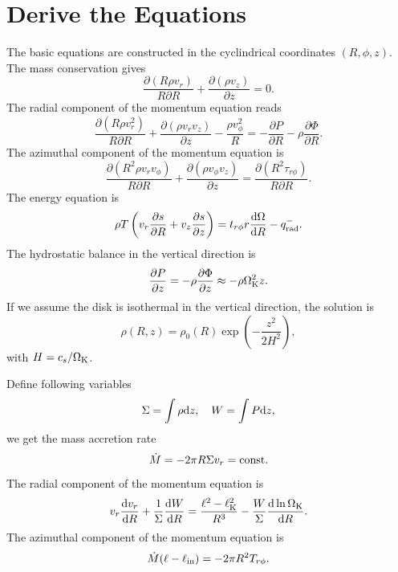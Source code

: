 \documentclass[oneside]{book}
\def\rd{{\rm d}}
\begin{document}
\chapter{Derive the Equations}
The basic equations are constructed in the cyclindrical coordinates $(R, \phi, z)$.
The mass conservation gives
\begin{equation}
\frac{\partial (R\rho v_r)}{R\partial R}+\frac{\partial (\rho v_z)}{\partial z}=0.
\end{equation}
The radial component of  the momentum equation reads
\begin{equation}
\frac{\partial (R\rho v_r^2)}{R\partial R}+\frac{\partial(\rho v_r v_z)}{\partial z}-\frac{\rho v_\phi^2}{R}
=-\frac{\partial P}{\partial R}-\rho\frac{\partial\Phi}{\partial R}.
\end{equation}
The azimuthal component of the momentum equation is
\begin{equation}
\frac{\partial(R^2\rho v_rv_\phi)}{R\partial R}+\frac{\partial (\rho v_\phi v_z)}{\partial z}
=\frac{\partial (R^2 \tau_{r\phi})}{R\partial R}.
\end{equation}
The energy equation is 
\begin{equation}
 \rho T\left(v_r\frac{\partial s}{\partial R}+v_z\frac{\partial s}{\partial z}\right)
 =t_{r\phi} r\frac{\rd\Omega}{\rd R}-q_{\rm rad}^-.
\end{equation}
The hydrostatic balance in the vertical direction is
\begin{equation}
\frac{\partial P}{\partial z}=-\rho\frac{\partial \Phi}{\partial z}\approx-\rho\Omega_{\rm K}^2z.
\end{equation}
If we assume the disk is isothermal in the vertical direction, the solution is 
\begin{equation}
\rho(R, z)=\rho_0(R)\exp\left(-\frac{z^2}{2H^2}\right),
\end{equation}
with $H=c_s/\Omega_{\rm K}$.

Define following variables
\begin{equation}
\Sigma=\int\rho\rd z, ~~~W=\int P\rd z,
\end{equation}
we get the mass accretion rate
\begin{equation}
 \dot M=-2\pi R\Sigma v_r={\rm const.}
\end{equation}
The radial component of the momentum equation is 
\begin{equation}
v_r\frac{\rd v_r}{\rd R}+\frac{1}{\Sigma}\frac{\rd W}{\rd R}=
\frac{\ell^2-\ell_{\rm K}^2}{R^3}-\frac{W}{\Sigma}\frac{\rd\ln\Omega_{\rm K}}{\rd R}.
\end{equation}
The azimuthal component of the momentum equation is
\begin{equation}
\dot M(\ell-\ell_{\rm in})=-2\pi R^2 T_{r\phi}.
\end{equation}
\end{document}
